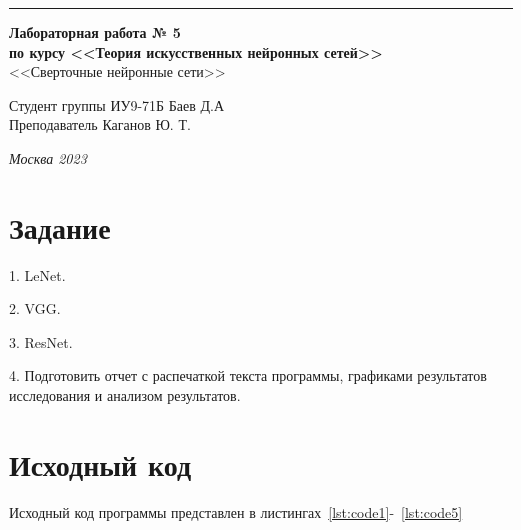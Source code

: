 \documentclass[a4paper, 14pt]{extarticle}
\begin{document}
\begin{titlepage}
\vspace*{-16pt}
\hspace{30pt}\rule{0.866\textwidth}{0.4pt}

\vspace{11em}

\begin{center}
\Large {\bf Лабораторная работа № 5} \\
\large {\bf по курсу <<Теория искусственных нейронных сетей>>} \\
\large <<Сверточные нейронные сети>>
\end{center}\normalsize

\vspace{8em}


\begin{flushright}
  {Студент группы ИУ9-71Б Баев Д.А \hspace*{15pt}\\
  \vspace{2ex}
  Преподаватель Каганов Ю. Т.\hspace*{15pt}}
\end{flushright}

\bigskip

\vfill


\begin{center}
\textsl{Москва 2023}
\end{center}
\end{titlepage}

\renewcommand{\ttdefault}{pcr}

\setlength{\tabcolsep}{3pt}
\newpage
\setcounter{page}{2}

\section{Задание}\label{Sect::task}
1. LeNet.

2. VGG.

3. ResNet.

4. Подготовить отчет с распечаткой текста программы, графиками
результатов исследования и анализом результатов.
\newpage
\section{Исходный код}

Исходный код программы представлен в листингах~\ref{lst:code1}-~\ref{lst:code5}
\end{document}
